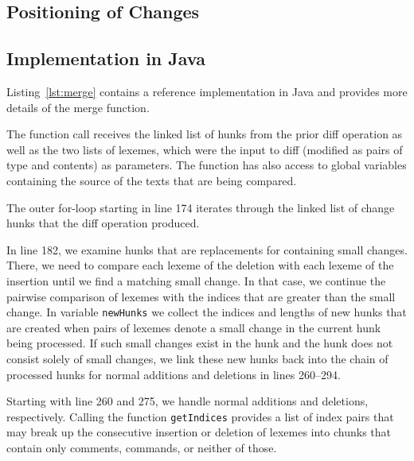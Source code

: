 \subsection{Positioning of Changes}


\subsection{Implementation in Java}

Listing~\ref{lst:merge} contains a reference implementation in Java and provides more details of the merge function.

The function call receives the linked list of hunks from the prior diff operation as well as the two lists of lexemes, which were the input to diff (modified as pairs of type and contents) as parameters.  The function has also access to global variables containing the source of the texts that are being compared.  

The outer for-loop starting in line 174 iterates through the linked list of change hunks that the diff operation produced.

In line 182, we examine hunks that are replacements for containing small changes.  There, we need to compare each lexeme of the deletion with each lexeme of the insertion until we find a matching small change.  In that case, we continue the pairwise comparison of lexemes with the indices that are greater than the small change.  In variable \texttt{newHunks} we collect the indices and lengths of new hunks that are created when pairs of lexemes denote a small change in the current hunk being processed.  If such small changes exist in the hunk and the hunk does not consist solely of small changes, we link these new hunks back into the chain of processed hunks for normal additions and deletions in lines 260--294.

Starting with line 260 and 275, we handle normal additions and deletions, respectively.  Calling the function \texttt{getIndices} provides a list of index pairs that may break up the consecutive insertion or deletion of lexemes into chunks that contain only comments, commands, or neither of those.


